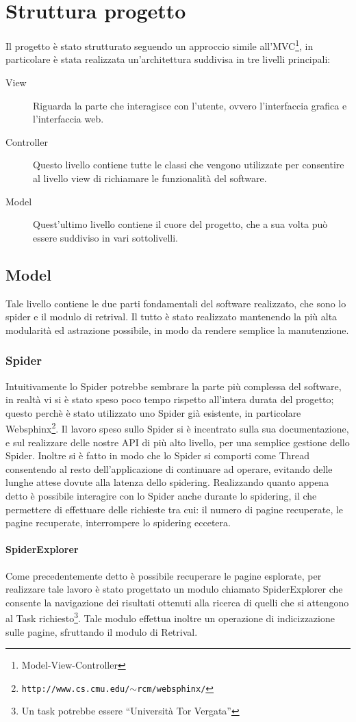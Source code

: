 \chapter{Struttura progetto}\label{cap:struttura}
Il progetto è stato strutturato seguendo un approccio simile all'MVC\footnote{Model-View-Controller}, in particolare è stata realizzata un'architettura suddivisa in tre livelli principali:
\begin{description}
\item[View]Riguarda la parte che interagisce con l'utente, ovvero l'interfaccia grafica e l'interfaccia web.
\item[Controller]Questo livello contiene tutte le classi che vengono utilizzate per consentire al livello view di richiamare le funzionalità del software.
\item[Model]Quest'ultimo livello contiene il cuore del progetto, che a sua volta può essere suddiviso in vari sottolivelli.
\end{description}
\section{Model}
Tale livello contiene le due parti fondamentali del software realizzato, che sono lo spider e il modulo di retrival. Il tutto è stato realizzato mantenendo la più alta modularità ed astrazione possibile, in modo da rendere semplice la manutenzione.
\subsection{Spider}
Intuitivamente lo Spider potrebbe sembrare la parte più complessa del software, in realtà vi si è stato speso poco tempo rispetto all'intera durata del progetto; questo perchè è stato utilizzato uno Spider già esistente, in particolare Websphinx\footnote{\texttt{http://www.cs.cmu.edu/$\sim$rcm/websphinx/}}. Il lavoro speso sullo Spider si è incentrato sulla sua documentazione, e sul realizzare delle nostre API di più alto livello, per una semplice gestione dello Spider. Inoltre si è fatto in modo che lo Spider si comporti come Thread consentendo al resto dell'applicazione di continuare ad operare, evitando delle lunghe attese dovute alla latenza dello spidering. Realizzando quanto appena detto è possibile interagire con lo Spider anche durante lo spidering, il che permettere di effettuare delle richieste tra cui: il numero di pagine recuperate, le pagine recuperate, interrompere lo spidering eccetera.
\subsubsection{SpiderExplorer}
Come precedentemente detto è possibile recuperare le pagine esplorate, per realizzare tale lavoro è stato progettato un modulo chiamato SpiderExplorer che consente la navigazione dei risultati ottenuti alla ricerca di quelli che si attengono al Task richiesto\footnote{Un task potrebbe essere ``Università Tor Vergata''}. Tale modulo effettua inoltre un operazione di indicizzazione sulle pagine, sfruttando il modulo di Retrival.

